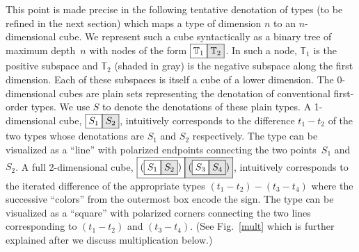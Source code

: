 \documentclass[authoryear,preprint]{sigplanconf}
\newcommand{\cubt}{\mathbb{T}}
\newcommand{\nodet}[2]{\fcolorbox{black}{white}{$#1$}\fcolorbox{black}{gray!20}{$#2$}}
\begin{document}
This point is made precise in the following tentative denotation of types (to
be refined in the next section) which maps a type of dimension $n$ to an
$n$-dimensional cube. We represent such a cube syntactically as a binary tree
of maximum depth~$n$ with nodes of the form $\nodet{\cubt_1}{\cubt_2}$. In
such a node, $\cubt_1$ is the positive subspace and $\cubt_2$ (shaded in
gray) is the negative subspace along the first dimension. Each of these
subspaces is itself a cube of a lower dimension. The $0$-dimensional cubes
are plain sets representing the denotation of conventional first-order
types. We use $S$ to denote the denotations of these plain types. A
1-dimensional cube, $\nodet{S_1}{S_2}$, intuitively corresponds to the
difference $t_1 - t_2$ of the two types whose denotations are $S_1$ and $S_2$
respectively. The type can be visualized as a ``line'' with polarized
endpoints connecting the two points~$S_1$ and $S_2$. A full 2-dimensional
cube, $\nodet{(\nodet{S_1}{S_2})}{(\nodet{S_3}{S_4})}$, intuitively
corresponds to the iterated difference of the appropriate types
$(t_1-t_2)-(t_3-t_4)$ where the successive ``colors'' from the outermost box
encode the sign. The type can be visualized as a ``square'' with polarized
corners connecting the two lines corresponding to $(t_1-t_2)$ and
$(t_3-t_4)$. (See Fig.~\ref{mult} which is further explained after we discuss
multiplication below.)
\end{document}

